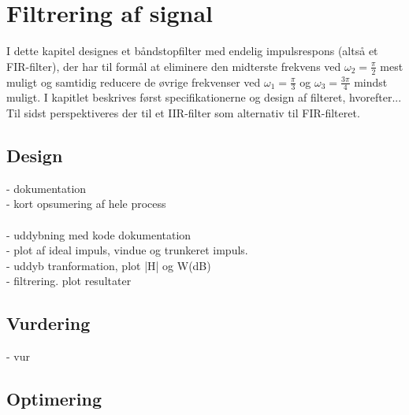 \chapter{Filtrering af signal}
I dette kapitel designes et båndstopfilter med endelig impulsrespons (altså et FIR-filter), der har til formål at eliminere den midterste frekvens ved $\omega_2 = \frac{\pi}{2}$ mest muligt og samtidig reducere de øvrige frekvenser ved $\omega_1 = \frac{\pi}{3}$ og $\omega_3 = \frac{3\pi}{4}$ mindst muligt. I kapitlet beskrives først specifikationerne og design af filteret, hvorefter... Til sidst perspektiveres der til et IIR-filter som alternativ til FIR-filteret.


\section{Design}
- dokumentation\\
- kort opsumering af hele process\\ 
\\
- uddybning med kode dokumentation\\
- plot af ideal impuls, vindue og trunkeret impuls.\\ 
- uddyb tranformation, plot |H| og W(dB)\\
- filtrering. plot resultater \\

\section{Vurdering}
- vur 

\section{Optimering}
